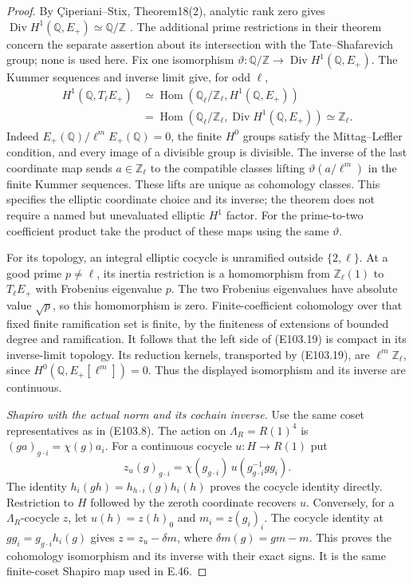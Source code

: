 \begin{proof}
By \c{C}iperiani--Stix, Theorem18(2), analytic rank zero gives
$\operatorname{Div}H^1(\mathbb Q,E_+)\simeq\mathbb Q/\mathbb Z$
\cite{EC_CiperianiStix}.  The additional prime restrictions
in their theorem concern the separate assertion about its
intersection with the Tate--Shafarevich group; none is used here.
Fix one isomorphism
$\vartheta:\mathbb Q/\mathbb Z\to
\operatorname{Div}H^1(\mathbb Q,E_+)$.
The Kummer sequences and inverse limit give, for odd $\ell$,
\[
 \begin{split}
 H^1(\mathbb Q,T_\ell E_+)
 &\simeq
 \operatorname{Hom}(\mathbb Q_\ell/\mathbb Z_\ell,
                   H^1(\mathbb Q,E_+))\\
 &=\operatorname{Hom}(\mathbb Q_\ell/\mathbb Z_\ell,
                   \operatorname{Div}H^1(\mathbb Q,E_+))
 \simeq\mathbb Z_\ell.
 \end{split}
 \tag{E103.19}
\]
Indeed $E_+(\mathbb Q)/\ell^mE_+(\mathbb Q)=0$,
the finite $H^0$ groups satisfy the Mittag--Leffler condition,
and every image of a divisible group is divisible.
The inverse of the last coordinate map sends $a\in\mathbb Z_\ell$
to the compatible classes lifting
$\vartheta(a/\ell^m)$ in the finite Kummer sequences.
These lifts are unique as cohomology classes.  This specifies
the elliptic coordinate choice and its inverse; the theorem
does not require a named but unevaluated elliptic $H^1$ factor.
For the prime-to-two coefficient product take the product of
these maps using the same $\vartheta$.

For its topology, an integral elliptic cocycle is unramified
outside $\{2,\ell\}$.  At a good prime $p\ne\ell$, its inertia
restriction is a homomorphism from $\mathbb Z_\ell(1)$ to
$T_\ell E_+$ with Frobenius eigenvalue $p$.
The two Frobenius eigenvalues have absolute value $\sqrt p$,
so this homomorphism is zero.  Finite-coefficient cohomology
over that fixed finite ramification set is finite, by the
finiteness of extensions of bounded degree and ramification.
It follows that the left side of (E103.19) is compact in its
inverse-limit topology.  Its reduction kernels, transported
by (E103.19), are $\ell^m\mathbb Z_\ell$, since
$H^0(\mathbb Q,E_+[\ell^m])=0$.
Thus the displayed isomorphism and its inverse are continuous.

\emph{Shapiro with the actual norm and its cochain inverse.}
Use the same coset representatives as in (E103.8).
The action on $\Lambda_R=R(1)^4$ is
$(g a)_{g\cdot i}=\chi(g)a_i$.
For a continuous cocycle $u:H\to R(1)$ put
\[
 z_u(g)_{g\cdot i}
     =\chi(g_{g\cdot i})\,u(g_{g\cdot i}^{-1}gg_i).
 \tag{E103.20}
\]
The identity $h_i(gh)=h_{h\cdot i}(g)h_i(h)$ proves the cocycle
identity directly.  Restriction to $H$ followed by the zeroth
coordinate recovers $u$.  Conversely, for a $\Lambda_R$-cocycle
$z$, let $u(h)=z(h)_0$ and $m_i=z(g_i)_i$.
The cocycle identity at $g g_i=g_{g\cdot i}h_i(g)$ gives
$z=z_u-\delta m$, where $\delta m(g)=gm-m$.
This proves the cohomology isomorphism and its inverse with
their exact signs.  It is the same finite-coset Shapiro map
used in E.46.


\end{proof}
